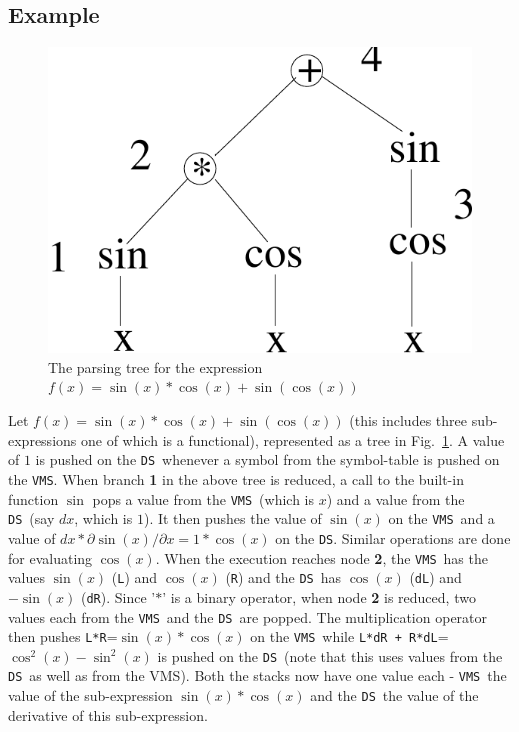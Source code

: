 \documentclass[12pt]{article}
\newcommand{\DS}{{\tt DS}}
\newcommand{\VMS}{{\tt VMS}}
\begin{document}
\subsection{Example}
\begin{figure}[t]
\begin{center}
  \includegraphics[scale=0.45]{Figs/fig1}
\caption[]{The parsing tree for the expression $f(x)=\sin(x)*\cos(x) + \sin(\cos(x))$}
\label{EX1}
\end{center}
\end{figure}
Let $f(x)=\sin(x)*\cos(x) + \sin(\cos(x))$ (this includes three
sub-expressions one of which is a functional), represented as a tree
in Fig.~\ref{EX1}.  A value of $1$ is pushed on the \DS\ whenever a
symbol from the symbol-table is pushed on the \VMS.  When branch {\bf
1} in the above tree is reduced, a call to the built-in function
$\sin$ pops a value from the \VMS\ (which is $x$) and a value from the
\DS\ (say $dx$, which is $1$).  It then pushes the value of $\sin(x)$
on the \VMS\ and a value of $dx*\partial \sin(x) / \partial x =
1*\cos(x)$ on the \DS.  Similar operations are done for evaluating
$\cos(x)$.  When the execution reaches node {\bf 2}, the \VMS\ has the
values $\sin(x)$ ({\tt L}) and $\cos(x)$ ({\tt R}) and the \DS\ has
$\cos(x)$ ({\tt dL}) and $-\sin(x)$ ({\tt dR}).  Since '$*$' is a
binary operator, when node {\bf 2} is reduced, two values each from
the \VMS\ and the \DS\ are popped.  The multiplication operator then
pushes {\tt L*R}=$\sin(x)*\cos(x)$ on the \VMS\ while {\tt L*dR +
R*dL}=$\cos^2(x)-\sin^2(x)$ is pushed on the \DS\ (note that this uses
values from the \DS\ as well as from the VMS).  Both the stacks now
have one value each - \VMS\ the value of the sub-expression
$\sin(x)*\cos(x)$ and the \DS\ the value of the derivative of this
sub-expression.
\end{document}
